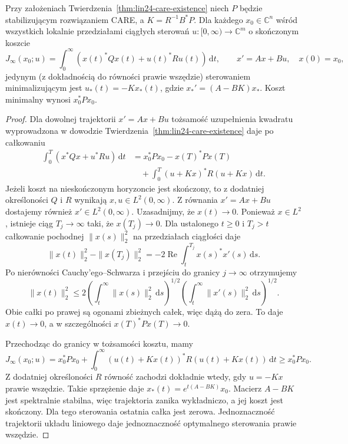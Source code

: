 \begin{wniosek}
\label{cor:lin24-cont-opt}
Przy założeniach
Twierdzenia~\ref{thm:lin24-care-existence}
niech \(P\) będzie
stabilizującym rozwiązaniem CARE,
a \(K=R^{-1}B^*P\).
Dla każdego \(x_0\in\mathbb C^n\)
wśród wszystkich lokalnie
przedziałami ciągłych
sterowań \(u\colon[0,\infty)\to\mathbb C^m\)
o skończonym koszcie
\[
 J_\infty(x_0;u)
 =\int_0^\infty
     (x(t)^*Qx(t)+u(t)^*Ru(t))
     \,\mathrm dt,
 \qquad x'=Ax+Bu,\quad x(0)=x_0,
\]
jedynym (z dokładnością do
równości prawie wszędzie)
sterowaniem minimalizującym
jest \(u_*(t)=-Kx_*(t)\),
gdzie \(x_*'=(A-BK)x_*\).
Koszt minimalny wynosi
\(x_0^*Px_0\).
\end{wniosek}
\begin{proof}
Dla dowolnej trajektorii
\(x'=Ax+Bu\)
tożsamość uzupełnienia
kwadratu wyprowadzona
w dowodzie
Twierdzenia~\ref{thm:lin24-care-existence}
daje po całkowaniu
\[
 \begin{aligned}
 \int_0^T(x^*Qx+u^*Ru)\,\mathrm dt
 &=x_0^*Px_0-x(T)^*Px(T)\\
 &\quad+\int_0^T
          (u+Kx)^*R(u+Kx)\,\mathrm dt.
 \end{aligned}
\]
Jeżeli koszt na nieskończonym
horyzoncie jest skończony,
to z dodatniej określoności
\(Q\) i \(R\) wynikają
\(x,u\in L^2(0,\infty)\).
Z równania \(x'=Ax+Bu\)
dostajemy również
\(x'\in L^2(0,\infty)\).
Uzasadnijmy, że \(x(t)\to0\).
Ponieważ \(x\in L^2\),
istnieje ciąg \(T_j\to\infty\)
taki, że \(x(T_j)\to0\).
Dla ustalonego \(t\ge0\)
i \(T_j>t\)
całkowanie pochodnej
\(\|x(s)\|_2^2\)
na przedziałach ciągłości
daje
\[
 \|x(t)\|_2^2-\|x(T_j)\|_2^2
 =-2\operatorname{Re}
     \int_t^{T_j}x(s)^*x'(s)\,\mathrm ds.
\]
Po nierówności Cauchy'ego--Schwarza
i przejściu do granicy
\(j\to\infty\) otrzymujemy
\[
 \|x(t)\|_2^2
 \le2\left(\int_t^\infty\|x(s)\|_2^2
       \,\mathrm ds\right)^{1/2}
       \left(\int_t^\infty\|x'(s)\|_2^2
       \,\mathrm ds\right)^{1/2}.
\]
Obie całki po prawej
są ogonami zbieżnych całek,
więc dążą do zera.
To daje \(x(t)\to0\),
a w szczególności
\(x(T)^*Px(T)\to0\).

Przechodząc do granicy
w tożsamości kosztu,
mamy
\[
 J_\infty(x_0;u)
 =x_0^*Px_0+
    \int_0^\infty
       (u(t)+Kx(t))^*R(u(t)+Kx(t))
      \,\mathrm dt
 \ge x_0^*Px_0.
\]
Z dodatniej określoności \(R\)
równość zachodzi dokładnie wtedy,
gdy \(u=-Kx\) prawie wszędzie.
Takie sprzężenie daje
\(x_*(t)=e^{t(A-BK)}x_0\).
Macierz \(A-BK\)
jest spektralnie stabilna,
więc trajektoria
zanika wykładniczo,
a jej koszt jest skończony.
Dla tego sterowania
ostatnia całka jest zerowa.
Jednoznaczność trajektorii
układu liniowego daje
jednoznaczność optymalnego
sterowania prawie wszędzie.
\end{proof}

